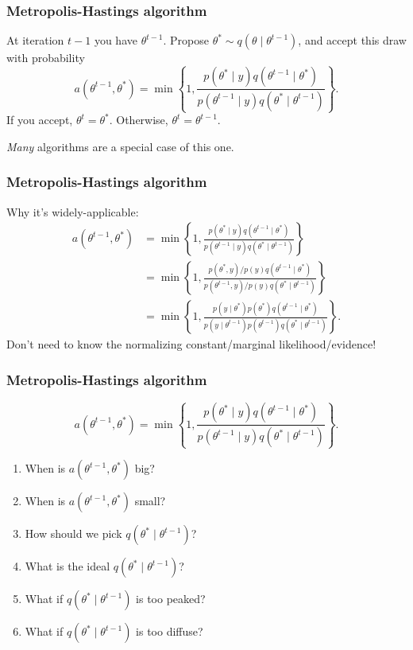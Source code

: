 \documentclass{beamer}
\begin{document}
\begin{frame}
\frametitle{Metropolis-Hastings algorithm}

At iteration $t-1$ you have $\theta^{t-1}$. Propose $\theta^* \sim q(\theta \mid \theta^{t-1})$, and accept this draw with probability 
$$
a(\theta^{t-1}, \theta^*) = \min\left\{1, \frac{p(\theta^* \mid y)q(\theta^{t-1} \mid \theta^*) }{p(\theta^{t-1} \mid y) q(\theta^* \mid \theta^{t-1}) }\right\}.
$$
If you accept, $\theta^t = \theta^*$. Otherwise, $\theta^t = \theta^{t-1}$. 
\newline

{\it Many} algorithms are a special case of this one.

\end{frame}
\begin{frame}
\frametitle{Metropolis-Hastings algorithm}

Why it's widely-applicable:
\begin{align*}
a(\theta^{t-1}, \theta^*) &= \min\left\{1, \frac{p(\theta^* \mid y)q(\theta^{t-1} \mid \theta^*) }{p(\theta^{t-1} \mid y) q(\theta^* \mid \theta^{t-1}) }\right\} \\
&= \min\left\{1, \frac{p(\theta^*, y)/p(y)q(\theta^{t-1} \mid \theta^*) }{p(\theta^{t-1}, y)/p(y) q(\theta^* \mid \theta^{t-1}) }\right\} \\
&= \min\left\{1, \frac{p(y \mid \theta^*) p(\theta^*)q(\theta^{t-1} \mid \theta^*) }{p(y \mid \theta^{t-1}) p(\theta^{t-1}) q(\theta^* \mid \theta^{t-1}) }\right\}.
\end{align*}
Don't need to know the normalizing constant/marginal likelihood/evidence!

\end{frame}
\begin{frame}
\frametitle{Metropolis-Hastings algorithm}

$$
a(\theta^{t-1}, \theta^*) = \min\left\{1, \frac{p(\theta^* \mid y)q(\theta^{t-1} \mid \theta^*) }{p(\theta^{t-1} \mid y) q(\theta^* \mid \theta^{t-1}) }\right\}.
$$

\begin{enumerate}
\item When is $a(\theta^{t-1}, \theta^*)$ big?
\item When is $a(\theta^{t-1}, \theta^*)$ small?
\item How should we pick $q(\theta^* \mid \theta^{t-1})$?
\item What is the ideal $q(\theta^* \mid \theta^{t-1})$?
\item What if $q(\theta^* \mid \theta^{t-1})$ is too peaked?
\item What if $q(\theta^* \mid \theta^{t-1})$ is too diffuse?
\end{enumerate}


\end{frame}
\end{document}

